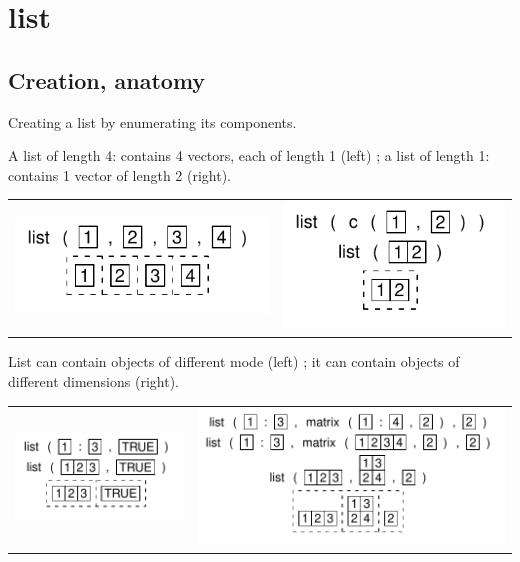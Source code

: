 \documentclass[pdflatex]{article}
\begin{document}
\section{list}

\subsection{Creation, anatomy}

Creating a list by enumerating its components.

A list of length 4: contains 4 vectors, each of length 1 (left) ;
a list of length 1: contains 1 vector of length 2 (right).

\begin{tabular}{cc}
\includegraphics{list_enumerate.pdf} & \includegraphics{list_onetype.pdf}
\end{tabular}

% 

List can contain objects of different mode (left) ;
it can contain objects of different dimensions (right).

\begin{tabular}{cc}
\includegraphics{list_twotypes.pdf} & \includegraphics{list_matrix.pdf}
\end{tabular}
\end{document}
